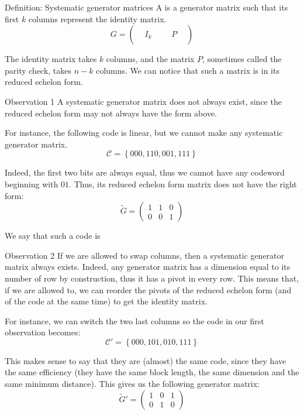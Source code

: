 \documentclass[a4paper]{article}
\begin{document}
\begin{parag}{Definition: Systematic generator matrices}
    A  is a generator matrix such that its first $k$ columns represent the identity matrix.
    \[G = \begin{pmatrix}  &  &  &  &  &  \\  & I_k &  &  & P &  \\  &  &  &  &  &  \end{pmatrix} \]

    The identity matrix takes $k$ columns, and the matrix $P$, sometimes called the parity check, takes $n-k$ columns. We can notice that such a matrix is in its reduced echelon form.

    \begin{subparag}{Observation 1}
        A systematic generator matrix does not always exist, since the reduced echelon form may not always have the form above.

        For instance, the following code is linear, but we cannot make any systematic generator matrix.
        \[\mathcal{C} = \left\{000, 110, 001, 111\right\}\]

        Indeed, the first two bits are always equal, thus we cannot have any codeword beginning with $01$. Thus, its reduced echelon form matrix does not have the right form: 
        \[\widetilde{G} = \begin{pmatrix} 1 & 1 & 0 \\ 0 & 0 & 1 \end{pmatrix} \]

        We say that such a code is 
    \end{subparag}

    \begin{subparag}{Observation 2}
        If we are allowed to swap columns, then a systematic generator matrix always exists. Indeed, any generator matrix has a dimension equal to its number of row by construction, thus it has a pivot in every row. This means that, if we are allowed to, we can reorder the pivots of the reduced echelon form (and of the code at the same time) to get the identity matrix.

        For instance, we can switch the two last columns so the code in our first observation becomes:
        \[\mathcal{C}' = \left\{000, 101, 010, 111\right\}\]

        This makes sense to say that they are (almost) the same code, since they have the same efficiency (they have the same block length, the same dimension and the same minimum distance). This gives us the following generator matrix:
        \[\widetilde{G}' = \begin{pmatrix} 1 & 0 & 1 \\ 0 & 1 & 0 \end{pmatrix} \]
    \end{subparag}


\end{parag}
\end{document}
